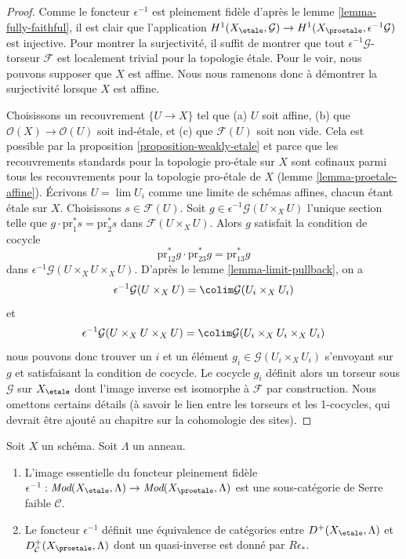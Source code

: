 \begin{proof}
Comme le foncteur $\epsilon^{-1}$ est pleinement fidèle d'après le
lemme \ref{lemma-fully-faithful},
il est clair que l'application
$H^1(X_\etale, \mathcal{G}) \to H^1(X_\proetale, \epsilon^{-1}\mathcal{G})$
est injective. Pour montrer la surjectivité, il suffit de montrer que
tout $\epsilon^{-1}\mathcal{G}$-torseur $\mathcal{F}$ est localement trivial pour la topologie \'etale.
Pour le voir, nous pouvons supposer que $X$ est affine.
Nous nous ramenons donc à démontrer la surjectivité lorsque $X$ est affine.

\medskip\noindent
Choisissons un recouvrement $\{U \to X\}$ tel que (a) $U$ soit affine, (b)
que $\mathcal{O}(X) \to \mathcal{O}(U)$ soit ind-\'etale, et (c) que $\mathcal{F}(U)$
soit non vide. Cela est possible par la proposition \ref{proposition-weakly-etale}
et parce que les
recouvrements standards pour la topologie pro-\'etale sur $X$ sont cofinaux parmi tous les recouvrements pour la topologie pro-\'etale
de $X$ (lemme \ref{lemma-proetale-affine}).
Écrivons $U = \lim U_i$ comme une limite de schémas affines, chacun étant \'etale sur $X$.
Choisissons $s \in \mathcal{F}(U)$. Soit
$g \in \epsilon^{-1}\mathcal{G}(U \times_X U)$
l'unique section telle que $g \cdot \text{pr}_1^*s = \text{pr}_2^*s$ dans
$\mathcal{F}(U \times_X U)$. Alors $g$ satisfait la condition de cocycle
$$
\text{pr}_{12}^*g \cdot \text{pr}_{23}^*g = \text{pr}_{13}^*g
$$
dans $\epsilon^{-1}\mathcal{G}(U \times_X U \times_X U)$. D'après le
lemme \ref{lemma-limit-pullback},
on a
$$
\epsilon^{-1}\mathcal{G}(U \times_X U) =
\colim \mathcal{G}(U_i \times_X U_i)
$$
et
$$
\epsilon^{-1}\mathcal{G}(U \times_X U \times_X U) =
\colim \mathcal{G}(U_i \times_X U_i \times_X U_i)
$$
nous pouvons donc trouver un $i$ et un élément $g_i \in \mathcal{G}(U_i \times_X U_i)$
s'envoyant sur $g$ et satisfaisant la condition de cocycle.
Le cocycle $g_i$ définit alors un torseur sous $\mathcal{G}$ sur
$X_\etale$ dont l'image inverse est isomorphe à $\mathcal{F}$
par construction. Nous omettons certains détails (à savoir le lien
entre les torseurs et les 1-cocycles, qui devrait être ajouté au chapitre
sur la cohomologie des sites).
\end{proof}

\begin{lemma}
\label{lemma-compare-derived}
Soit $X$ un schéma. Soit $\Lambda$ un anneau.
\begin{enumerate}
\item L'image essentielle du foncteur pleinement fidèle
$\epsilon^{-1} : \textit{Mod}(X_\etale, \Lambda) \to
\textit{Mod}(X_\proetale, \Lambda)$
est une sous-catégorie de Serre faible $\mathcal{C}$.
\item Le foncteur $\epsilon^{-1}$ définit une équivalence de catégories
entre $D^+(X_\etale, \Lambda)$ et $D^+_\mathcal{C}(X_\proetale, \Lambda)$
dont un quasi-inverse est donné par $R\epsilon_*$.
\end{enumerate}
\end{lemma}

